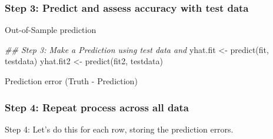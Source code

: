 \documentclass[
  letterpaper,
  DIV=11,
  numbers=noendperiod]{scrreprt}
\newenvironment{Shaded}{\begin{snugshade}}{\end{snugshade}}
\newcommand{\DocumentationTok}[1]{\textcolor[rgb]{0.37,0.37,0.37}{\textit{#1}}}
\newcommand{\FunctionTok}[1]{\textcolor[rgb]{0.28,0.35,0.67}{#1}}
\newcommand{\NormalTok}[1]{\textcolor[rgb]{0.00,0.23,0.31}{#1}}
\newcommand{\OtherTok}[1]{\textcolor[rgb]{0.00,0.23,0.31}{#1}}
\newcommand{\SpecialCharTok}[1]{\textcolor[rgb]{0.37,0.37,0.37}{#1}}
\begin{document}
\hypertarget{step-3-predict-and-assess-accuracy-with-test-data}{%
\subsubsection{Step 3: Predict and assess accuracy with test
data}\label{step-3-predict-and-assess-accuracy-with-test-data}}

Out-of-Sample prediction

\begin{Shaded}
\begin{Highlighting}[]
\DocumentationTok{\#\# Step 3: Make a Prediction using test data and}
\NormalTok{yhat.fit }\OtherTok{\textless{}{-}} \FunctionTok{predict}\NormalTok{(fit, testdata)}
\NormalTok{yhat.fit2 }\OtherTok{\textless{}{-}} \FunctionTok{predict}\NormalTok{(fit2, testdata)}
\end{Highlighting}
\end{Shaded}

Prediction error (Truth - Prediction)

\begin{Shaded}
\end{Shaded}

\hypertarget{step-4-repeat-process-across-all-data}{%
\subsubsection{Step 4: Repeat process across all
data}\label{step-4-repeat-process-across-all-data}}

Step 4: Let's do this for each row, storing the prediction errors.
\end{document}
